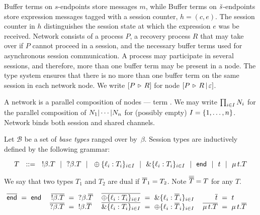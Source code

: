 Buffer terms on $s$-endpoints store messages $m$, while
Buffer terms on $\breve{s}$-endpoints store expression messages
tagged with a session counter, $h = (c, e)$.
%
The session counter in $h$ distinguishes the session
state at which the expression $e$ was be received.
%
Network \Node consists of a process $P$,
a recovery process $R$ that may take over if $P$
cannot proceed in a session, and the necessary buffer
terms used for asynchronous session communication.
%
A process may participate in several sessions, and therefore,
more than one buffer term may be present in a node.
The type system ensures that there is no more than one
buffer term on the same session in each network node.
We write $[P \,\triangleright\, R]$ for node
$[P \,\triangleright\, R \,|\, \varepsilon]$.

A network is a parallel composition of nodes --- term \Parallel.
We may write $\prod_{i \in I} N_i$ for the parallel composition of
$N_1 | \cdots | N_n$
for (possibly empty) $I = \{1, \dots, n\}$. %
Network \Restriction binds both session and shared channels.

\begin{definition}
	Let $\mathcal B$ be a set of \emph{base types} ranged over by~$\beta$.
	Session types are inductively defined by the following grammar:


		\vspace{-2mm}
		\[
			T	\ \ ::=\ \ 	{}!\beta. T
				\ \ |\ \ 		{}?\beta. T
				\ \ |\ \ 		\oplus\{{\ell}_i: {T}_i\}_{i\in I}
				\ \ |\ \ 		\&\{{\ell}_i\mathrel:{T}_i\}_{i\in I}
				\ \ |\ \ 		\mathsf{end}
				\ \ |\ \ 		t
				\ \ |\ \ 		\mu\,t. T
		\]

	\vspace{-2mm}
\end{definition}



%

We say that two types $T_1$ and $T_2$ are dual if $\overline{T}_1 = T_2$.
Note $\overline{\overline{T}} = T$ for any $T$.

\noindent
$
	\arraycolsep=3pt
	\begin{array}{rclcrclcrclcrcl}
		\tdual\tend	&=&	\tend
		&&
		\tdual{\tout\beta T}	&=&	\tin\beta \tdual T
		&&
		\tdual{\tselI{\ell}{T}}	&=&	\tbranchI{\ell}{\tdual{T}}
		&&
		\tdual{\tvar t}			&=&	\tvar t
		\\
		&&&&
		\tdual{\tin\beta T}	&=&	\tout\beta \tdual T
		&&
		\tdual{\tbranchI{\ell}{T}} &=&	\tselI{\ell}{\tdual{T}}
		&&
		\tdual{\trec t T}	&=&	\trec t \tdual T
	\end{array}
$

